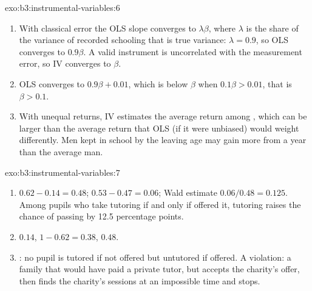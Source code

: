 \begin{solution}{exo:b3:instrumental-variables:6}
\begin{enumerate}
\item With classical error the OLS slope converges to $\lambda\beta$, where
$\lambda$ is the share of the variance of recorded schooling that is true
variance: $\lambda = 0.9$, so OLS converges to $0.9\beta$. A valid instrument
is uncorrelated with the measurement error, so IV converges to $\beta$.
\item OLS converges to $0.9\beta + 0.01$, which is below $\beta$ when $0.1\beta
> 0.01$, that is $\beta > 0.1$.
\item With unequal returns, IV estimates the average return among ,
which can be larger than the average return that OLS (if it were unbiased)
would weight differently. Men kept in school by the leaving age may gain more
from a year than the average man.
\end{enumerate}
\end{solution}

\begin{solution}{exo:b3:instrumental-variables:7}
\begin{enumerate}
\item {} $0.62 - 0.14 = 0.48$;  $0.53 - 0.47 = 0.06$;
Wald estimate $0.06/0.48 = 0.125$. Among pupils who take tutoring if and only
if offered it, tutoring raises the chance of passing by 12.5 percentage points.
\item {} $0.14$,  $1 - 0.62 = 0.38$,  $0.48$.
\item {}: no pupil is tutored if not offered but untutored if
offered. A violation: a family that would have paid a private tutor, but
accepts the charity's offer, then finds the charity's sessions at an
impossible time and stops.
\end{enumerate}
\end{solution}

